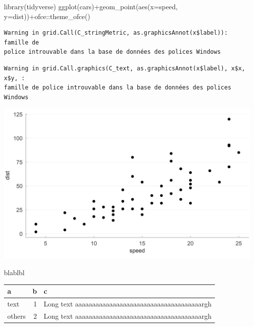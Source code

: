 \documentclass[
  11pt,
  a4paper,
  DIV=10]{scrreprt}
\newenvironment{Shaded}{\begin{snugshade}}{\end{snugshade}}
\newcommand{\AttributeTok}[1]{\textcolor[rgb]{0.40,0.45,0.13}{#1}}
\newcommand{\FunctionTok}[1]{\textcolor[rgb]{0.28,0.35,0.67}{#1}}
\newcommand{\NormalTok}[1]{\textcolor[rgb]{0.00,0.23,0.31}{#1}}
\newcommand{\SpecialCharTok}[1]{\textcolor[rgb]{0.37,0.37,0.37}{#1}}
\begin{document}
\begin{tcolorbox}[enhanced jigsaw, titlerule=0mm, coltitle=black, bottomtitle=1mm, colframe=quarto-callout-tip-color-frame, opacityback=0, toprule=.15mm, bottomrule=.15mm, colbacktitle=quarto-callout-tip-color!10!white, colback=white, left=2mm, leftrule=.75mm, breakable, rightrule=.15mm, title={titre de l'encadré}, arc=.35mm, toptitle=1mm, opacitybacktitle=0.6]

\begin{Shaded}
\begin{Highlighting}[]
\FunctionTok{library}\NormalTok{(tidyverse)}
\FunctionTok{ggplot}\NormalTok{(cars)}\SpecialCharTok{+}\FunctionTok{geom\_point}\NormalTok{(}\FunctionTok{aes}\NormalTok{(}\AttributeTok{x=}\NormalTok{speed, }\AttributeTok{y=}\NormalTok{dist))}\SpecialCharTok{+}\NormalTok{ofce}\SpecialCharTok{::}\FunctionTok{theme\_ofce}\NormalTok{()}
\end{Highlighting}
\end{Shaded}

\begin{verbatim}
Warning in grid.Call(C_stringMetric, as.graphicsAnnot(x$label)): famille de
police introuvable dans la base de données des polices Windows
\end{verbatim}

\begin{verbatim}
Warning in grid.Call.graphics(C_text, as.graphicsAnnot(x$label), x$x, x$y, :
famille de police introuvable dans la base de données des polices Windows
\end{verbatim}

\includegraphics{test_files/figure-pdf/unnamed-chunk-2-1.png}

blablbl

\label{tbl-table2}
\begin{longtable}[]{@{}lrl@{}}
\toprule\noalign{}
a & b & c \\
\midrule\noalign{}
\endhead
\bottomrule\noalign{}
\endlastfoot
text & 1 & Long text aaaaaaaaaaaaaaaaaaaaaaaaaaaaaaaaaaaaargh \\
others & 2 & Long text aaaaaaaaaaaaaaaaaaaaaaaaaaaaaaaaaaaaargh \\
\end{longtable}

\end{tcolorbox}
\end{document}
